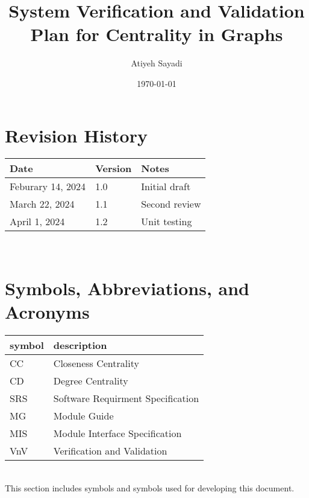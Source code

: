 \documentclass[12pt, titlepage]{article}
\begin{document}
\title{ System Verification and Validation Plan for Centrality in Graphs{}} 
\author{Atiyeh Sayadi}
\date{\today}
	
\maketitle


\section*{Revision History}

\begin{tabularx}{\textwidth}{p{3cm}p{2cm}X}
\toprule {\bf Date} & {\bf Version} & {\bf Notes}\\
\midrule
Feburary 14,  2024 & 1.0 & Initial draft\\
March 22, 2024& 1.1 & Second review\\
April 1, 2024& 1.2 & Unit testing\\
\bottomrule
\end{tabularx}

~\\


\newpage

\tableofcontents

\listoftables


\listoffigures

\newpage

\section{Symbols, Abbreviations, and Acronyms}

\renewcommand{\arraystretch}{1.2}
\begin{tabular}{l l} 
  \toprule		
  \textbf{symbol} & \textbf{description}\\
  \midrule 
  CC& Closeness Centrality \\
  CD& Degree Centrality  \\
SRS & Software Requirment Specification\\
MG& Module Guide\\
MIS& Module Interface Specification\\
VnV& Verification and Validation\\
  \bottomrule
\end{tabular}\\

This section includes symbols and symbols used for developing this document.
\end{document}
